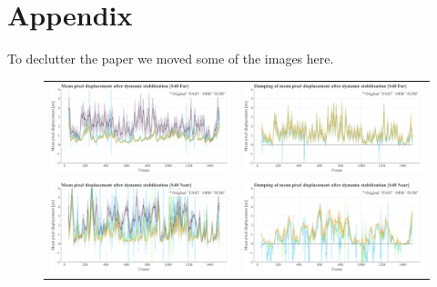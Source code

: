 
\newpage

\section{Appendix}
\label{sec:appendix}
To declutter the paper we moved some of the images here.

\begin{figure}[!ht]
  \centering
    \begin{tabular}{cc}
      \includegraphics[width=0.475\linewidth]{diagrams/optical_flow/mean_pixel_shifts_after_dynamic_stabilization_s40_far.png}    &  
      \includegraphics[width=0.475\linewidth]{diagrams/optical_flow/damping_mean_pixel_shifts_after_dynamic_stabilization_s40_far.png}   \\ 

      \includegraphics[width=0.475\linewidth]{diagrams/optical_flow/mean_pixel_shifts_after_dynamic_stabilization_s40_near.png}    &  
      \includegraphics[width=0.475\linewidth]{diagrams/optical_flow/damping_mean_pixel_shifts_after_dynamic_stabilization_s40_near.png}      \\


\end{tabular}
\end{figure}
